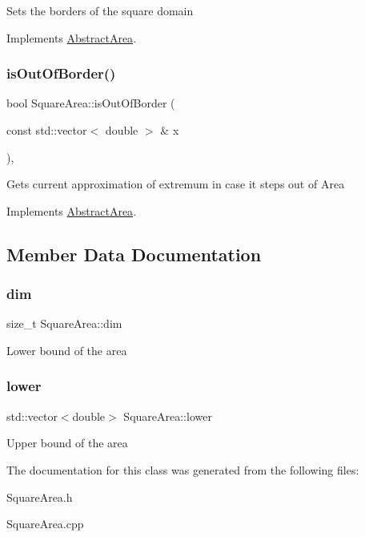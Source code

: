 Sets the borders of the square domain 

Implements \hyperlink{class_abstract_area_ab54f9d3063d994f780f2b5b67d8751d9}{Abstract\+Area}.

\mbox{\label{class_square_area_afd99ae01cff4b1e31511a22e9b89b42a}} 
\subsubsection{\texorpdfstring{is\+Out\+Of\+Border()}{isOutOfBorder()}}
{\footnotesize\ttfamily bool Square\+Area\+::is\+Out\+Of\+Border (\begin{DoxyParamCaption}\item[{const std\+::vector$<$ double $>$ \&}]{x }\end{DoxyParamCaption})\hspace{0.3cm}{\ttfamily [override]}, {\ttfamily [virtual]}}

Gets current approximation of extremum in case it steps out of Area 

Implements \hyperlink{class_abstract_area_a16c1ac9b2ece460e5e465cda862ce278}{Abstract\+Area}.



\subsection{Member Data Documentation}
\mbox{\label{class_square_area_ac758b2a9b3f3bd9eb0d3a0c528f23931}} 
\subsubsection{\texorpdfstring{dim}{dim}}
{\footnotesize\ttfamily size\+\_\+t Square\+Area\+::dim\hspace{0.3cm}{\ttfamily [private]}}

Lower bound of the area \mbox{\label{class_square_area_a9225f1cc2152524ea140390d605d65e0}} 
\subsubsection{\texorpdfstring{lower}{lower}}
{\footnotesize\ttfamily std\+::vector$<$double$>$ Square\+Area\+::lower\hspace{0.3cm}{\ttfamily [private]}}

Upper bound of the area 

The documentation for this class was generated from the following files\+:\begin{DoxyCompactItemize}
\item 
Square\+Area.\+h\item 
Square\+Area.\+cpp\end{DoxyCompactItemize}
